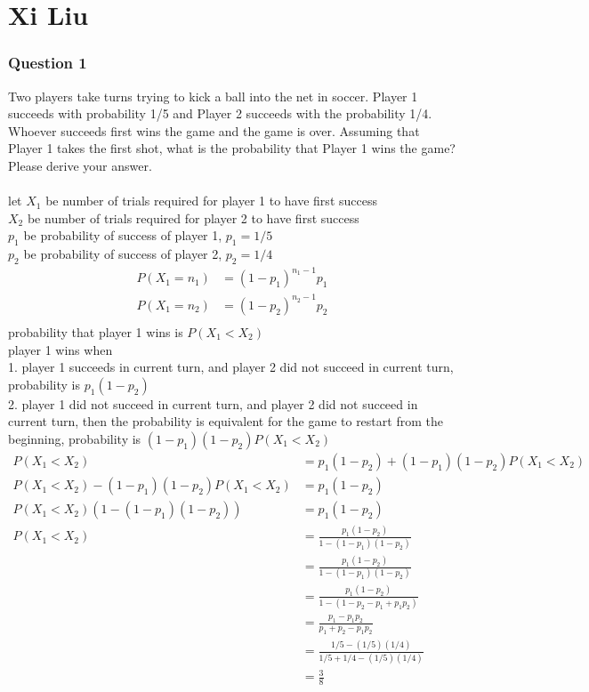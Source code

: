 \documentclass[12pt, border = 4pt, multi]{article} %
\begin{document}
\section*{Xi Liu}
\subsubsection*{Question 1}
Two players take turns trying to 
kick a ball into the net in soccer. 
Player 1 succeeds with probability 
1/5 and Player 2 succeeds with 
the probability 1/4. Whoever 
succeeds first wins the game 
and the game is over. 
Assuming that Player 1 takes the 
first shot, what is the 
probability that Player 1 wins 
the game? Please derive your 
answer.\\
\\
let $X_1$ be number of trials required for player 1 to have first success\\
$X_2$ be number of trials required for player 2 to have first success\\
$p_1$ be probability of success of player 1, $p_1 = 1 / 5$\\
$p_2$ be probability of success of player 2, $p_2 = 1/ 4$\\
\begin{align*}
P(X_1 = n_1) &= (1 - p_1) ^ {n_1 - 1} p_1\\
P(X_1 = n_2) &= (1 - p_2) ^ {n_2 - 1} p_2\\
\end{align*}
probability that player 1 wins is $P(X_1 < X_2)$\\
player 1 wins when\\
1. player 1 succeeds in current turn, and player 2 did not succeed in current turn, probability is $p_1(1 - p_2)$\\
2. player 1 did not succeed in current turn, and player 2 did not succeed in current turn, then the probability is equivalent for the game to restart from the beginning, probability is $(1 - p_1)(1 - p_2)P(X_1 < X_2)$
\begin{align*}
P(X_1 < X_2) &= p_1(1 - p_2) + (1 - p_1)(1 - p_2)P(X_1 < X_2)\\
P(X_1 < X_2) - (1 - p_1)(1 - p_2)P(X_1 < X_2) &= p_1(1 - p_2)\\
P(X_1 < X_2)(1 - (1 - p_1)(1 - p_2)) &= p_1(1 - p_2)\\
P(X_1 < X_2) &= \frac{p_1(1 - p_2)}{1 - (1 - p_1)(1 - p_2)}\\
&= \frac{p_1(1 - p_2)}{1 - (1 - p_1)(1 - p_2)}\\
&= \frac{p_1(1 - p_2)}{1 - (1 - p_2 - p_1 + p_1 p_2)}\\
&= \frac{p_1 - p_1 p_2}{p_1 + p_2 - p_1 p_2}\\
&= \frac{1 / 5 - (1 / 5)(1 / 4)}{1 / 5 + 1 / 4 - (1 / 5)(1 / 4)}\\
&= \boxed{\frac{3}{8}}\\
\end{align*}
\newpage
\noindent
\end{document}
